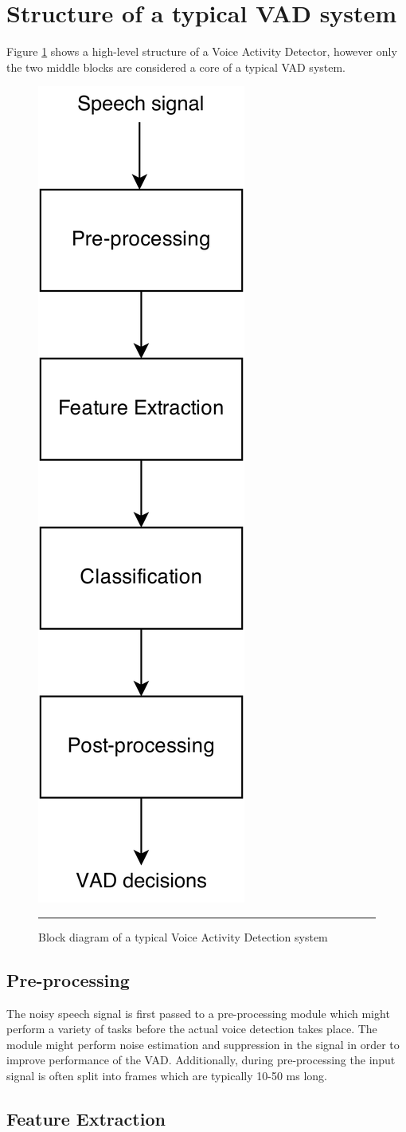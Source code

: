 
\section{Structure of a typical VAD system}

Figure \ref{fig:VADStructure} shows a high-level structure of a Voice Activity Detector, however only the two middle blocks are considered a core of a typical VAD system.

\begin{figure}[htbp]
	\centering
		\includegraphics[width=0.15\columnwidth]{Figures/VADStructure2.png}
		\rule{37em}{0.5pt}
	\caption[Block diagram of a typical Voice Activity Detection system]{Block diagram of a typical Voice Activity Detection system}
	\label{fig:VADStructure}
\end{figure}

\subsection{Pre-processing}

The noisy speech signal is first passed to a pre-processing module which might perform a variety of tasks before the actual voice detection takes place. The module might perform noise estimation and suppression in the signal in order to improve performance of the VAD. Additionally, during pre-processing the input signal is often split into frames which are typically 10-50 ms long.

\subsection{Feature Extraction}

